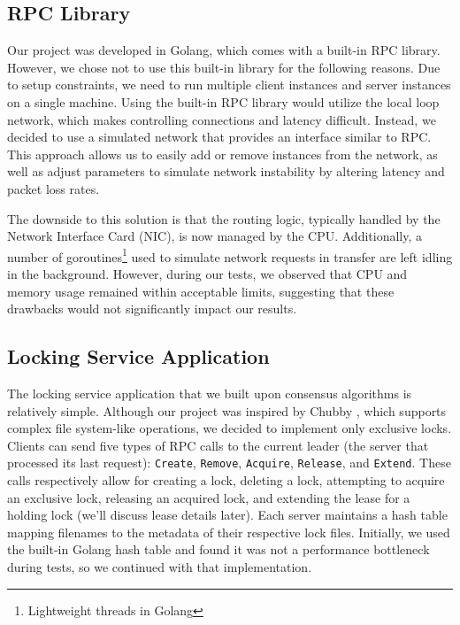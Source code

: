 \documentclass[11pt,a4paper]{article}
\begin{document}
\subsection{RPC Library}\label{subsecRPC}
Our project was developed in Golang, which comes with a built-in RPC library. However, we chose not to use this built-in library for the following reasons. Due to setup constraints, we need to run multiple client instances and server instances on a single machine. Using the built-in RPC library would utilize the local loop network, which makes controlling connections and latency difficult. Instead, we decided to use a simulated network that provides an interface similar to RPC. This approach allows us to easily add or remove instances from the network, as well as adjust parameters to simulate network instability by altering latency and packet loss rates.

The downside to this solution is that the routing logic, typically handled by the Network Interface Card (NIC), is now managed by the CPU. Additionally, a number of goroutines\footnote{Lightweight threads in Golang} used to simulate network requests in transfer are left idling in the background. However, during our tests, we observed that CPU and memory usage remained within acceptable limits, suggesting that these drawbacks would not significantly impact our results.

\subsection{Locking Service Application}\label{subsecKV}
The locking service application that we built upon consensus algorithms is relatively simple. Although our project was inspired by Chubby \cite{burrows2006chubby}, which supports complex file system-like operations, we decided to implement only exclusive locks. Clients can send five types of RPC calls to the current leader (the server that processed its last request): \verb|Create|, \verb|Remove|, \verb|Acquire|, \verb|Release|, and \verb|Extend|. These calls respectively allow for creating a lock, deleting a lock, attempting to acquire an exclusive lock, releasing an acquired lock, and extending the lease for a holding lock (we'll discuss lease details later). Each server maintains a hash table mapping filenames to the metadata of their respective lock files. Initially, we used the built-in Golang hash table and found it was not a performance bottleneck during tests, so we continued with that implementation.
\end{document}
